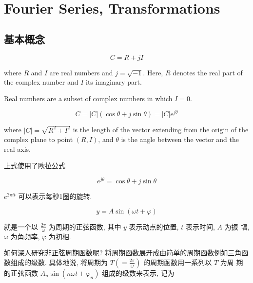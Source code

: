 \chapter{Fourier Series, Transformations}

\section{基本概念}

\begin{definition}
    $$ C=R+j I $$

    where $ R $ and $ I $ are real numbers and $ j=\sqrt{-1} $. Here, $ R $ denotes the real part of the complex number and $ I $ its imaginary part. 
    
    Real numbers are a subset of complex numbers in which $I = 0$.
\end{definition}

\begin{definition}
    $$ C=|C|(\cos \theta+j \sin \theta) = |C| e^{j \theta} $$
    
    where $ |C|=\sqrt{R^{2}+I^{2}} $ is the length of the vector extending from the origin of the complex plane to point $ (R, I) $, and $ \theta $ is the angle between the vector and the real axis.
\end{definition}

上式使用了欧拉公式

\begin{theorem}
    $$ e^{j \theta}=\cos \theta+j \sin \theta $$
\end{theorem}

\begin{corollary}
    $e^{2 \pi it}$ 可以表示每秒1圈的旋转. 
\end{corollary}

\begin{definition}[正弦函数]
    $$ y=A \sin (\omega t+\varphi) $$

    就是一个以 $ \frac{2 \pi}{\omega} $ 为周期的正弦函数, 其中 $ y $ 表示动点的位置, $ t $ 表示时间, $ A $ 为振 幅, $ \omega $ 为角频率, $ \varphi $ 为初相.
\end{definition}

如何深人研究非正弦周期函数呢? 将周期函数展开成由简单的周期函数例如三角函数组成的级数. 具体地说, 将周期为 $ T\left(=\frac{2 \pi}{\omega}\right) $ 的周期函数用一系列以 $ T $ 为周 期的正弦函数 $ A_{n} \sin \left(n \omega t+\varphi_{n}\right) $ 组成的级数来表示, 记为

